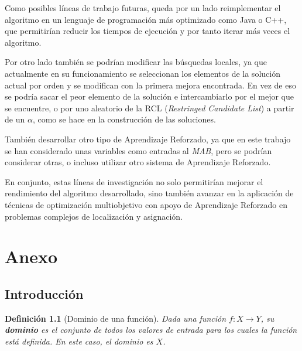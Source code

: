 \documentclass[12pt,a4paper]{book}
\newtheorem{defi}{Definición}[section]
\begin{document}
Como posibles líneas de trabajo futuras, queda por un lado reimplementar el algoritmo en un lenguaje de programación más
optimizado como Java o C++, que permitirían reducir los tiempos de ejecución y por tanto iterar más veces el algoritmo.

Por otro lado también se podrían modificar las búsquedas locales, ya que actualmente en su funcionamiento se seleccionan los elementos de la solución actual por orden y se modifican
con la primera mejora encontrada. En vez de eso se podría sacar el peor elemento de la solución e intercambiarlo por el mejor que se encuentre, o por
uno aleatorio de la RCL (\textit{Restringed Candidate List}) a partir de un $\alpha$, como se hace en la construcción de las soluciones.

También desarrollar otro tipo de Aprendizaje Reforzado, ya que en este trabajo se han considerado unas variables como entradas al \textit{MAB}, pero se podrían considerar otras,
o incluso utilizar otro sistema de Aprendizaje Reforzado.

En conjunto, estas líneas de investigación no solo permitirían mejorar el rendimiento del algoritmo desarrollado, sino también avanzar en la aplicación de técnicas de optimización multiobjetivo con apoyo de Aprendizaje Reforzado en problemas complejos de localización y asignación.  








\chapter{Anexo}
\section{Introducción}
\begin{defi}[Dominio de una función]
\label{def:dominio}
Dada una función $f: X \to Y$, su \textbf{dominio} es el conjunto de todos los valores de entrada para los cuales la función está definida. En este caso, el dominio es $X$.
\end{defi}
\end{document}
